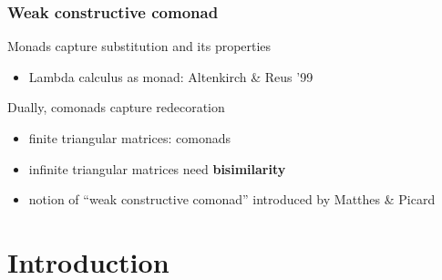 \documentclass[
serif,
mathsans,
]
{beamer}
\newcommand{\fat}[1]{\textbf{#1}}
\begin{document}
\begin{frame}
 \frametitle{Weak constructive comonad}
 \begin{block}{Monads capture substitution and its properties}
   \begin{itemize}
    \item Lambda calculus as monad: Altenkirch \& Reus '99
   \end{itemize}
 \end{block}

\begin{block}{Dually, comonads capture redecoration}
   \begin{itemize}
    \item finite triangular matrices: comonads
    \item infinite triangular matrices need \fat{bisimilarity}
    \item notion of \enquote{weak constructive comonad} introduced by Matthes \& Picard
   \end{itemize}
\end{block}

 
 
\end{frame}






\section*{Introduction}
\end{document}
